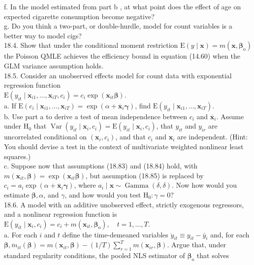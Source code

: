\documentclass[10pt]{article}
\begin{document}
f. In the model estimated from part b , at what point does the effect of age on expected cigarette consumption become negative?\\
g. Do you think a two-part, or double-hurdle, model for count variables is a better way to model cigs?\\
18.4. Show that under the conditional moment restriction $\mathrm{E}(y \mid \mathbf{x})=m\left(\mathbf{x}, \boldsymbol{\beta}_{\mathrm{o}}\right)$ the Poisson QMLE achieves the efficiency bound in equation (14.60) when the GLM variance assumption holds.\\
18.5. Consider an unobserved effects model for count data with exponential regression function\\
$\mathrm{E}\left(y_{i t} \mid \mathbf{x}_{i 1}, \ldots, \mathbf{x}_{i T}, c_{i}\right)=c_{i} \exp \left(\mathbf{x}_{i t} \boldsymbol{\beta}\right)$.\\
a. If $\mathrm{E}\left(c_{i} \mid \mathbf{x}_{i 1}, \ldots, \mathbf{x}_{i T}\right)=\exp \left(\alpha+\overline{\mathbf{x}}_{i} \boldsymbol{\gamma}\right)$, find $\mathrm{E}\left(y_{i t} \mid \mathbf{x}_{i 1}, \ldots, \mathbf{x}_{i T}\right)$.\\
b. Use part a to derive a test of mean independence between $c_{i}$ and $\overline{\mathbf{x}}_{i}$. Assume under $\mathrm{H}_{0}$ that $\operatorname{Var}\left(y_{i t} \mid \mathbf{x}_{i}, c_{i}\right)=\mathrm{E}\left(y_{i t} \mid \mathbf{x}_{i}, c_{i}\right)$, that $y_{i t}$ and $y_{i r}$ are uncorrelated conditional on $\left(\mathbf{x}_{i}, c_{i}\right)$, and that $c_{i}$ and $\mathbf{x}_{i}$ are independent. (Hint: You should devise a test in the context of multivariate weighted nonlinear least squares.)\\
c. Suppose now that assumptions (18.83) and (18.84) hold, with $m\left(\mathbf{x}_{i t}, \boldsymbol{\beta}\right)= \exp \left(\mathbf{x}_{i t} \boldsymbol{\beta}\right)$, but assumption (18.85) is replaced by $c_{i}=a_{i} \exp \left(\alpha+\overline{\mathbf{x}}_{i} \boldsymbol{\gamma}\right)$, where $a_{i} \mid \mathbf{x} \sim \operatorname{Gamma}(\delta, \delta)$. Now how would you estimate $\boldsymbol{\beta}, \alpha$, and $\gamma$, and how would you test $\mathrm{H}_{0}: \gamma=0 ?$\\
18.6. A model with an additive unobserved effect, strictly exogenous regressors, and a nonlinear regression function is\\
$\mathrm{E}\left(y_{i t} \mid \mathbf{x}_{i}, c_{i}\right)=c_{i}+m\left(\mathbf{x}_{i t}, \boldsymbol{\beta}_{\mathrm{o}}\right), \quad t=1, \ldots, T$.\\
a. For each $i$ and $t$ define the time-demeaned variables $\ddot{y}_{i t} \equiv y_{i t}-\bar{y}_{i}$ and, for each $\boldsymbol{\beta}, \ddot{m}_{i t}(\boldsymbol{\beta})=m\left(\mathbf{x}_{i t}, \boldsymbol{\beta}\right)-(1 / T) \sum_{r=1}^{T} m\left(\mathbf{x}_{i r}, \boldsymbol{\beta}\right)$. Argue that, under standard regularity conditions, the pooled NLS estimator of $\boldsymbol{\beta}_{\mathrm{o}}$ that solves
\end{document}
